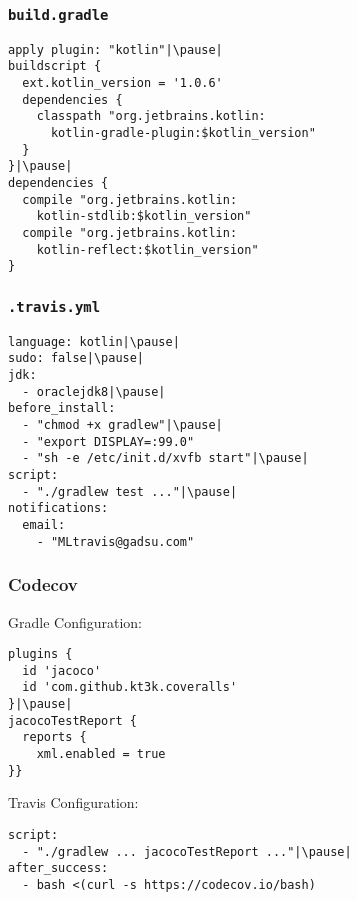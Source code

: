 


\begin{frame}[fragile] \frametitle{\texttt{build.gradle}}
\begin{lstlisting}
apply plugin: "kotlin"|\pause|
buildscript {
  ext.kotlin_version = '1.0.6'
  dependencies {
    classpath "org.jetbrains.kotlin:
      kotlin-gradle-plugin:$kotlin_version"
  }
}|\pause|
dependencies {
  compile "org.jetbrains.kotlin:
    kotlin-stdlib:$kotlin_version"
  compile "org.jetbrains.kotlin:
    kotlin-reflect:$kotlin_version"
}
\end{lstlisting}
\end{frame}


\begin{frame}[fragile] \frametitle{\texttt{.travis.yml}}
\begin{lstlisting}
language: kotlin|\pause|
sudo: false|\pause|
jdk:
  - oraclejdk8|\pause|
before_install:
  - "chmod +x gradlew"|\pause|
  - "export DISPLAY=:99.0"
  - "sh -e /etc/init.d/xvfb start"|\pause|
script:
  - "./gradlew test ..."|\pause|
notifications:
  email:
    - "MLtravis@gadsu.com"
\end{lstlisting}
\end{frame}


\begin{frame}[fragile] \frametitle{Codecov} 
Gradle Configuration:

\begin{lstlisting}
plugins {
  id 'jacoco'
  id 'com.github.kt3k.coveralls'
}|\pause|
jacocoTestReport {
  reports {
    xml.enabled = true
}}
\end{lstlisting}
\pause

Travis Configuration:

\begin{lstlisting}
script:
  - "./gradlew ... jacocoTestReport ..."|\pause|
after_success:
  - bash <(curl -s https://codecov.io/bash)
\end{lstlisting}


\end{frame}





